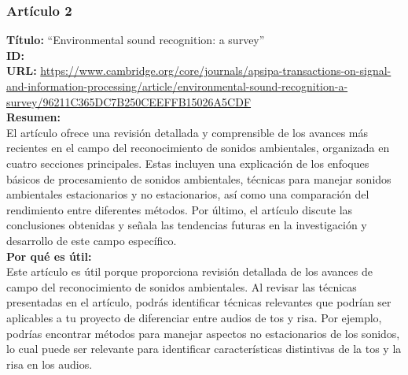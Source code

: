 \subsubsection*{Artículo 2}
\begin{flushleft}
    \textbf{Título:}
    “Environmental sound recognition: a survey”
    \\
    \textbf{ID: \cite{chachada2014environmental}}
    \\
    \textbf{URL:}
    \url{https://www.cambridge.org/core/journals/apsipa-transactions-on-signal-and-information-processing/article/environmental-sound-recognition-a-survey/96211C365DC7B250CEEFFB15026A5CDF}
    \\
    \textbf{Resumen:\\}
    El artículo ofrece una revisión detallada y comprensible de los avances más recientes en el campo del reconocimiento de sonidos ambientales, organizada en cuatro secciones principales. Estas incluyen una explicación de los enfoques básicos de procesamiento de sonidos ambientales, técnicas para manejar sonidos ambientales estacionarios y no estacionarios, así como una comparación del rendimiento entre diferentes métodos. Por último, el artículo discute las conclusiones obtenidas y señala las tendencias futuras en la investigación y desarrollo de este campo específico.
    \\
    \textbf{Por qué es útil:\\}
    Este artículo es útil porque proporciona revisión detallada de los avances de campo del reconocimiento de sonidos ambientales. Al revisar las técnicas presentadas en el artículo, podrás identificar técnicas relevantes que podrían ser aplicables a tu proyecto de diferenciar entre audios de tos y risa. Por ejemplo, podrías encontrar métodos para manejar aspectos no estacionarios de los sonidos, lo cual puede ser relevante para identificar características distintivas de la tos y la risa en los audios.
\end{flushleft}
